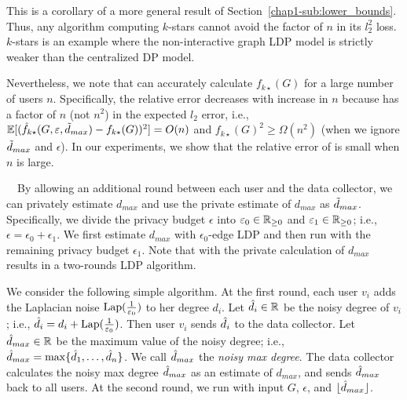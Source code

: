 This is a corollary of a more general result of Section~\ref{chap1-sub:lower_bounds}. Thus,
any algorithm computing $k$-stars cannot avoid the factor of $n$ in its $l_2^2$
loss. $k$-stars 
is an example where the non-interactive graph LDP model is strictly weaker than
the centralized DP model.

Nevertheless, we note that  can accurately calculate $f_{k\star}(G)$ for a large number of users $n$. 
Specifically, the relative error decreases with increase in $n$ 
because  has a factor of $n$ (not $n^2$) in the expected $l_2$ error, i.e., 
$\mathbb{E}[(\hat{f}_{k\star}(G, \varepsilon, \tilde{d}_{max}) - f_{k\star}(G))^2] = O(n)$ and $f_{k\star}(G)^2 \geq \Omega(n^2)$ (when we ignore $\tilde{d}_{max}$ and $\epsilon$). 
In our experiments, we show that the relative error of  is 
small when $n$ is large.

\smallskip
{}~~By allowing an additional round between each user and the data collector, we can privately estimate $d_{max}$ and use the private estimate of $d_{max}$ as $\tilde{d}_{max}$. 
Specifically, 
we divide the privacy budget $\epsilon$ into 
$\varepsilon_0 \in \mathbb{R}_{\ge0}$ and $\varepsilon_1 \in \mathbb{R}_{\ge0}$; i.e., $\epsilon = \epsilon_0 + \epsilon_1$. 
We first estimate $d_{max}$ with $\epsilon_0$-edge LDP and then run  with the remaining privacy budget $\epsilon_1$. 
Note that  with the private calculation of $d_{max}$ results in a two-rounds LDP algorithm.

We consider the following simple algorithm. 
At the first round, 
each user $v_i$ adds the Laplacian noise $\textrm{Lap}(\frac{1}{\varepsilon_0})$ to her degree $d_i$. 
Let $\hat{d}_i \in \mathbb{R}$ be the noisy degree of $v_i$; i.e., $\hat{d}_i = d_i + \textrm{Lap}(\frac{1}{\varepsilon_0})$. 
Then user $v_i$ sends $\hat{d}_i$ to the data collector. 
Let $\hat{d}_{max} \in \mathbb{R}$ be the maximum value of the noisy degree; i.e., $\hat{d}_{max} = \max\{\hat{d}_1, \ldots, \hat{d}_n\}$. 
We call $\hat{d}_{max}$ the \textit{noisy max degree}. 
The data collector calculates the noisy max degree $\hat{d}_{max}$ 
as 
an estimate of $d_{max}$, 
and sends $\hat{d}_{max}$ back to all users. 
At the second round, we run  
with input $G$, 
$\epsilon$, and $\lfloor \hat{d}_{max} \rfloor$.

